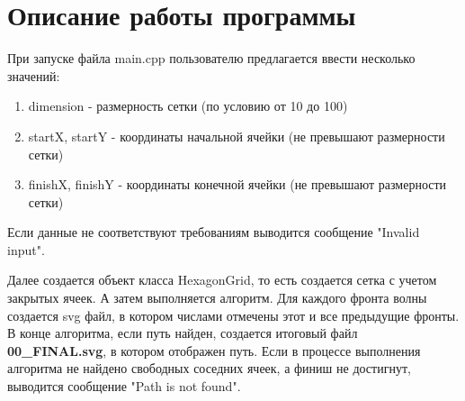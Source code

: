 \chapter{Описание работы программы}
\label{cha:ch_4}

При запуске файла main.cpp пользователю предлагается ввести несколько значений:
\begin {enumerate}
	\item dimension - размерность сетки (по условию от 10 до 100)
	\item startX, startY - координаты начальной ячейки (не превышают размерности сетки)
	\item finishX, finishY - координаты конечной ячейки (не превышают размерности сетки)
\end {enumerate}
Если данные не соответствуют требованиям выводится сообщение "Invalid input".

Далее создается объект класса HexagonGrid, то есть создается сетка с учетом закрытых ячеек. А затем выполняется алгоритм. Для каждого фронта волны создается svg файл, в котором числами отмечены этот и все предыдущие фронты. В конце алгоритма, если путь найден, создается итоговый файл \textbf{00\_FINAL.svg}, в котором отображен путь. Если в процессе выполнения алгоритма не найдено свободных соседних ячеек, а финиш не достигнут, выводится сообщение "Path is not found".

